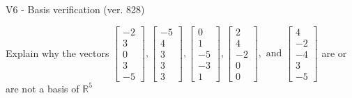 \begin{exercise}
  \begin{exerciseTitle}V6 - Basis verification (ver. 828)\end{exerciseTitle}
  \begin{exerciseStatement}
    Explain why the vectors \(\left[\begin{array}{r}
-2 \\
3 \\
0 \\
3 \\
-5
\end{array}\right] , \left[\begin{array}{r}
-5 \\
4 \\
3 \\
3 \\
3
\end{array}\right] , \left[\begin{array}{r}
0 \\
1 \\
-5 \\
-3 \\
1
\end{array}\right] , \left[\begin{array}{r}
2 \\
4 \\
-2 \\
0 \\
0
\end{array}\right] , \text{ and } \left[\begin{array}{r}
4 \\
-2 \\
-4 \\
3 \\
-5
\end{array}\right]\) are or are not a basis of \(\mathbb{R}^5\)	



\end{exerciseStatement}
\end{exercise}
